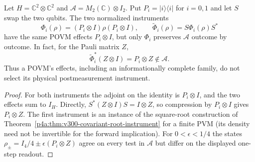 \documentclass[12pt,a4paper]{article}
\begin{document}
\begin{proposition}
\label{p4a:prop:v300-swap-instrument-witness}
Let $H=\mathbb C^2\otimes\mathbb C^2$ and
$\mathcal A=M_2(\mathbb C)\otimes I_2$. Put
$P_i=|i\rangle\langle i|$ for $i=0,1$ and let $S$ swap the two
qubits. The two normalized instruments
\[
 \Phi_i(\rho)=(P_i\otimes I)\rho(P_i\otimes I),\qquad
 \widetilde\Phi_i(\rho)=S\Phi_i(\rho)S^*
\]
have the same POVM effects $P_i\otimes I$, but only $\Phi_i$ preserves
$\mathcal A$ outcome by outcome. In fact, for the Pauli matrix $Z$,
\[
 \widetilde\Phi_i^*(Z\otimes I)=P_i\otimes Z\notin\mathcal A.
\]
Thus a POVM's effects, including an informationally complete family,
do not select its physical postmeasurement instrument.
\end{proposition}
\begin{proof}
For both instruments the adjoint on the identity is $P_i\otimes I$,
and the two effects sum to $I_H$. Directly,
$S^*(Z\otimes I)S=I\otimes Z$, so compression by
$P_i\otimes I$ gives $P_i\otimes Z$.
The first instrument is an instance of the square-root construction
of Theorem~\ref{p4a:thm:v300-covariant-root-instrument} for a finite
PVM (its density need not be invertible for the forward implication).
For $0<\epsilon<1/4$ the states
$\rho_\pm=I_4/4\pm\epsilon(P_i\otimes Z)$ agree on every test in
$\mathcal A$ but differ on the displayed one-step readout.
\end{proof}
\end{document}
